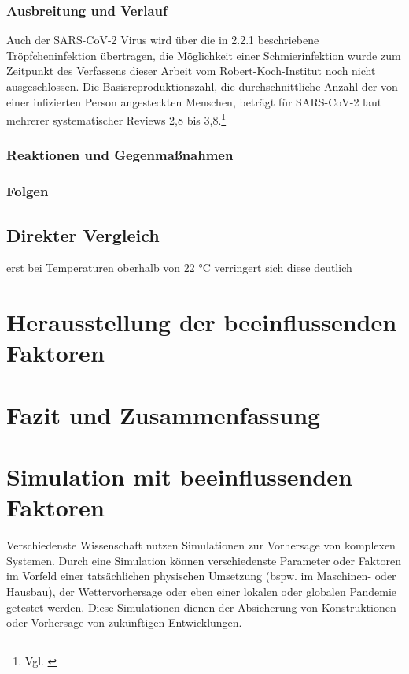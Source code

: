 \documentclass[12pt]{article}
\begin{document}
\subsubsection{Ausbreitung und Verlauf}
Auch der SARS-CoV-2 Virus wird über die in 2.2.1 beschriebene Tröpfcheninfektion übertragen, die Möglichkeit einer Schmierinfektion wurde zum Zeitpunkt des Verfassens dieser Arbeit vom Robert-Koch-Institut noch nicht ausgeschlossen. Die Basisreproduktionszahl, die durchschnittliche Anzahl der von einer infizierten Person angesteckten Menschen, beträgt für SARS-CoV-2 laut mehrerer systematischer Reviews 2,8 bis 3,8.\footnote{Vgl. \cite{Rki21}} 
\subsubsection{Reaktionen und Gegenmaßnahmen}
\subsubsection{Folgen}
\subsection{Direkter Vergleich }
erst bei Temperaturen oberhalb von 22 °C verringert sich diese deutlich
\section{Herausstellung der beeinflussenden Faktoren}
\section{Fazit und Zusammenfassung}

\section{Simulation mit beeinflussenden Faktoren}

Verschiedenste Wissenschaft nutzen Simulationen zur Vorhersage von komplexen Systemen. Durch eine Simulation können verschiedenste Parameter oder Faktoren im Vorfeld einer tatsächlichen physischen Umsetzung (bspw. im Maschinen- oder Hausbau), der Wettervorhersage oder eben einer lokalen oder globalen Pandemie getestet werden. Diese Simulationen dienen der Absicherung von Konstruktionen oder Vorhersage von zukünftigen Entwicklungen.
\end{document}
